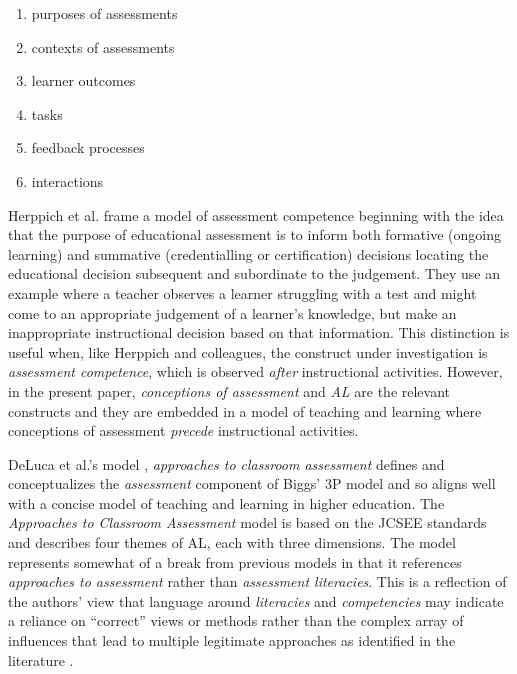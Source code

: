 \documentclass[
]{book}
\providecommand{\tightlist}{%
  \setlength{\itemsep}{0pt}\setlength{\parskip}{0pt}}
\begin{document}
\begin{enumerate}
\def\labelenumi{\arabic{enumi}.}
\tightlist
\item
  purposes of assessments
\item
  contexts of assessments
\item
  learner outcomes
\item
  tasks
\item
  feedback processes
\item
  interactions
\end{enumerate}

Herppich et al. \citeyearpar{herppichTeachersAssessmentCompetence2018} frame a model of assessment competence beginning with the idea that the purpose of educational assessment is to inform both formative (ongoing learning) and summative (credentialling or certification) decisions locating the educational decision subsequent and subordinate to the judgement. They use an example where a teacher observes a learner struggling with a test and might come to an appropriate judgement of a learner's knowledge, but make an inappropriate instructional decision based on that information. This distinction is useful when, like Herppich and colleagues, the construct under investigation is \emph{assessment competence}, which is observed \emph{after} instructional activities. However, in the present paper, \emph{conceptions of assessment} and \emph{AL} are the relevant constructs and they are embedded in a model of teaching and learning where conceptions of assessment \emph{precede} instructional activities.

DeLuca et al.'s model \citeyearpar{delucaApproachesClassroomAssessment2016}, \emph{approaches to classroom assessment} defines and conceptualizes the \emph{assessment} component of Biggs' 3P model \citetext{\citeyear{biggsWhatStudentDoes1999}; \citeyear{biggsTheoryPracticeCognitive1993}} and so aligns well with a concise model of teaching and learning in higher education. The \emph{Approaches to Classroom Assessment} model is based on the JCSEE standards \citep{klingerClassroomAssessmentStandards2015} and describes four themes of AL, each with three dimensions. The model represents somewhat of a break from previous models in that it references \emph{approaches to assessment} rather than \emph{assessment literacies}. This is a reflection of the authors' view that language around \emph{literacies} and \emph{competencies} may indicate a reliance on ``correct'' views or methods rather than the complex array of influences that lead to multiple legitimate approaches as identified in the literature \citep{delucaDifferentialSituatedView2019, willisConceptualisingTeachersAssessment2013}.
\end{document}
